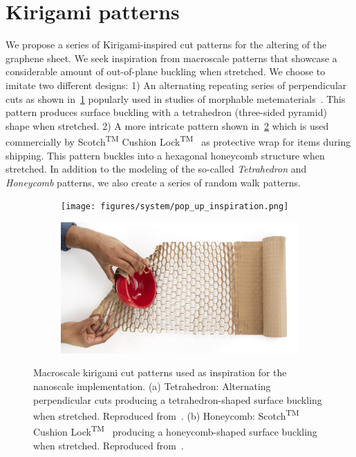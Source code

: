 \section{Kirigami patterns}
We propose a series of Kirigami-inspired cut patterns for the altering of the graphene sheet. We seek inspiration from macroscale patterns that showcase a considerable amount of out-of-plane buckling when stretched. We choose to imitate two different designs: 1) An alternating repeating series of perpendicular cuts as shown in~\cref{fig:kirigami_inspiration_a} popularly used in studies of morphable metematerials~\cite{new_pop_up}. This pattern produces surface buckling with a tetrahedron (three-sided pyramid) shape when stretched. 2) A more intricate pattern shown in~\cref{fig:kirigami_inspiration_b} which is used commercially by Scotch\textsuperscript{TM} Cushion Lock\textsuperscript{TM}~\cite{cushion_wrap} as protective wrap for items during shipping. This pattern buckles into a hexagonal honeycomb structure when stretched. In addition to the modeling of the so-called \textit{Tetrahedron} and \textit{Honeycomb} patterns, we also create a series of random walk patterns.

\begin{figure}[!htb]
  \centering
  \begin{subfigure}[t]{0.48\textwidth}
      \centering
      \texttt{[image: figures/system/pop\_up\_inspiration.png]}
      \caption{}
      \label{fig:kirigami_inspiration_a}
    \end{subfigure}
    \hfill
    \begin{subfigure}[t]{0.48\textwidth}
      \centering
      \includegraphics[width=\textwidth]{figures/system/honeycomb_inspiration.jpg}
      \caption{}
      \label{fig:kirigami_inspiration_b}
  \end{subfigure}
  \hfill
     \caption{Macroscale kirigami cut patterns used as inspiration for the nanoscale implementation. (a) Tetrahedron: Alternating perpendicular cuts producing a tetrahedron-shaped surface buckling when stretched. Reproduced from~\cite{new_pop_up}. (b) Honeycomb: Scotch\textsuperscript{TM} Cushion Lock\textsuperscript{TM}~\cite{cushion_wrap} producing a honeycomb-shaped surface buckling when stretched. Reproduced from~\cite{cushion_wrap}.}
     \label{fig:kirigami_inspiration}
\end{figure}

